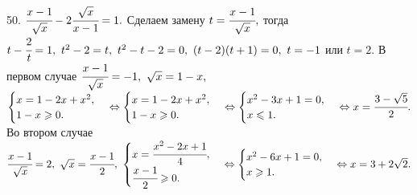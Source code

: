 50. $\cfrac{x-1}{\sqrt{x}}-2\cfrac{\sqrt{x}}{x-1}=1.$ Сделаем замену $t=\cfrac{x-1}{\sqrt{x}},$ тогда $t-\cfrac{2}{t}=1,\ t^2-2=t,\ t^2-t-2=0,\ (t-2)(t+1)=0,\ t=-1$ или $t=2.$ В первом случае $\cfrac{x-1}{\sqrt{x}}=-1,\ \sqrt{x}=1-x,$\\$ \begin{cases} x=1-2x+x^2,\\ 1-x\geqslant0.\end{cases}\Leftrightarrow
\begin{cases} x=1-2x+x^2,\\ 1-x\geqslant0.\end{cases}\Leftrightarrow\begin{cases} x^2-3x+1=0,\\ x\leqslant1.\end{cases}\Leftrightarrow x=\cfrac{3-\sqrt{5}}{2}.$
Во втором случае $\cfrac{x-1}{\sqrt{x}}=2,\ \sqrt{x}=\cfrac{x-1}{2},\ \begin{cases} x=\cfrac{x^2-2x+1}{4},\\ \cfrac{x-1}{2}\geqslant0.\end{cases}\Leftrightarrow
\begin{cases} x^2-6x+1=0,\\ x\geqslant1.\end{cases}\Leftrightarrow x=3+2\sqrt{2}.$\\
